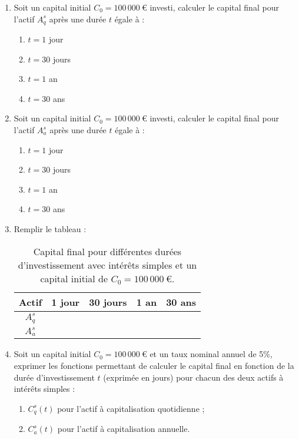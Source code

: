 \documentclass{article}
\begin{document}
\begin{enumerate}[label=\textbf{Q\arabic*.}]
    \item Soit un capital initial \( C_0 = 100\,000\ \text{€} \) investi, calculer le capital final pour l'actif \( A_q^s \) après une durée \( t \) égale à :
    \begin{enumerate}[label=(\alph*)]
        \item \( t = 1 \) jour
        \item \( t = 30 \) jours
        \item \( t = 1 \) an
        \item \( t = 30 \) ans
    \end{enumerate}

    \item Soit un capital initial \( C_0 = 100\,000\ \text{€} \) investi, calculer le capital final pour l'actif $A_a^s$ après une durée \( t \) égale à :
    \begin{enumerate}[label=(\alph*)]
        \item \( t = 1 \) jour
        \item \( t = 30 \) jours
        \item \( t = 1 \) an
        \item \( t = 30 \) ans
    \end{enumerate}
    
    \item Remplir le tableau :\\
    \begin{table}[h!]
        \centering
        \begin{tabular}{|c|c|c|c|c|}
        \hline
        \textbf{Actif} & \textbf{1 jour} & \textbf{30 jours} & \textbf{1 an} & \textbf{30 ans} \\
        \hline
        $A_q^s$ & & & & \\
        \hline
        $A_a^s$ & & & & \\
        \hline
        \end{tabular}
        \caption{Capital final pour différentes durées d'investissement avec intérêts simples et un capital initial de \( C_0 = 100\,000\ \text{€} \).}
        \label{tab:simple_interest_results}
    \end{table}

    \item Soit un capital initial \( C_0 = 100\,000\ \text{€} \) et un taux nominal annuel de 5\%, exprimer les fonctions permettant de calculer le capital final en fonction de la durée d'investissement \( t \) (exprimée en jours) pour chacun des deux actifs à intérêts simples :
    \begin{enumerate}[label=(\alph*)]
        \item \( C^s_q(t) \) pour l'actif à capitalisation quotidienne ;
        \item \( C^s_a(t) \) pour l'actif à capitalisation annuelle.
    \end{enumerate}


\end{enumerate}
\end{document}
